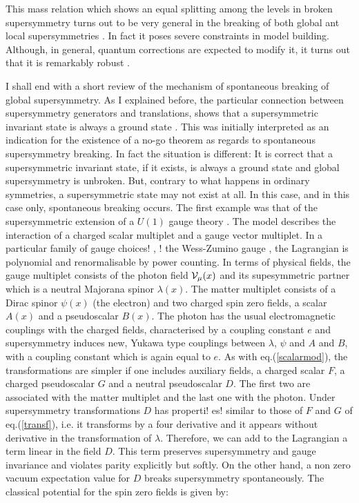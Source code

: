 \documentclass[a4paper,11pt]{article}
\begin{document}
This mass relation which shows an equal splitting among the levels in broken supersymmetry turns out to be very general in the breaking of both global ant local supersymmetries \cite{FGP}. In fact it poses severe constraints in model building. Although, in general, quantum corrections are expected to modify it, it turns out that it is remarkably robust \cite{GI}.

I shall end with a short review of the mechanism of spontaneous  breaking of global supersymmetry. As I explained before, the particular connection between supersymmetry generators and translations, shows that a supersymmetric invariant state is always a ground state \cite{IZ}. This was initially interpreted as an indication for the existence of a no-go theorem as regards to spontaneous supersymmetry breaking. In fact the situation is different: It is correct that a supersymmetric invariant state, if it exists,  is always a ground state and global supersymmetry is unbroken. But, contrary to what happens in ordinary symmetries, a supersymmetric state may not exist at all. In this case, and in this case only, spontaneous breaking occurs. The first example \cite{FI} was that of the supersymmetric extension of a $U(1)$ gauge theory \cite{WZIII}. The model describes the interaction of a charged scalar multiplet and a gauge vector multiplet. In a particular family of gauge choices!
, !
the Wess-Zumino gauge \cite{WZII
I}, the Lagrangian is polynomial and renormalisable by power counting. In terms of physical fields, the gauge multiplet consists of the photon field ${\cal{V}_{\mu}}(x)$ and its supesymmetric partner which is a neutral Majorana spinor $\lambda (x)$. The matter multiplet consists of a Dirac spinor $\psi (x)$ (the electron) and two charged spin zero fields, a scalar $A(x)$ and a pseudoscalar $B(x)$. The photon has the usual electromagnetic couplings with the charged fields, characterised by a coupling constant $e$ and  supersymmetry induces new, Yukawa type couplings between $\lambda$, $\psi$ and $A$ and $B$,  with a coupling constant which is again equal to $e$. As with eq.(\ref{scalarmod}), the transformations are simpler if one includes auxiliary fields, a charged scalar $F$, a charged pseudoscalar $G$ and a neutral  pseudoscalar $D$. The first two are associated with the matter multiplet and the last one with the photon. Under supersymmetry transformations $D$ has properti!
es!
 similar to those of $F$ and $G$
 of eq.(\ref{transf}), i.e. it transforms by a four derivative and it appears without derivative in the transformation of $\lambda$. Therefore, we can add to the Lagrangian a term linear in the field $D$. This term preserves  supersymmetry and gauge invariance and violates parity explicitly but softly. On the other hand, a non zero vacuum expectation value for $D$ breaks supersymmetry spontaneously. The classical potential for the spin zero fields is given by:
\end{document}
